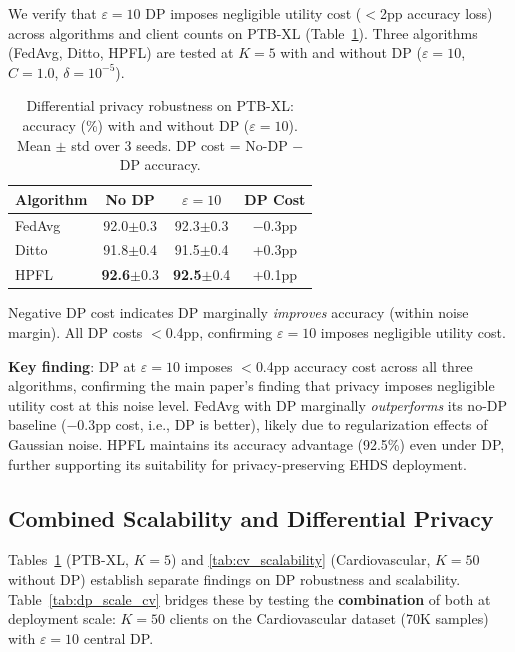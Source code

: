 \documentclass[conference,a4paper]{IEEEtran}
\begin{document}
We verify that $\varepsilon{=}10$ DP imposes negligible utility cost ($<$2pp accuracy loss) across algorithms and client counts on PTB-XL (Table~\ref{tab:dp_scale}). Three algorithms (FedAvg, Ditto, HPFL) are tested at $K{=}5$ with and without DP ($\varepsilon{=}10$, $C{=}1.0$, $\delta{=}10^{-5}$).

\begin{table}[htbp]
\centering
\caption{Differential privacy robustness on PTB-XL: accuracy (\%) with and without DP ($\varepsilon{=}10$). Mean $\pm$ std over 3 seeds. DP cost = No-DP $-$ DP accuracy.}
\label{tab:dp_scale}
\small
\begin{tabular}{lccc}
\toprule
\textbf{Algorithm} & \textbf{No DP} & \textbf{$\varepsilon{=}10$} & \textbf{DP Cost} \\
\midrule
FedAvg & 92.0{\tiny$\pm$0.3} & 92.3{\tiny$\pm$0.3} & $-$0.3pp \\
Ditto & 91.8{\tiny$\pm$0.4} & 91.5{\tiny$\pm$0.4} & +0.3pp \\
HPFL & \textbf{92.6}{\tiny$\pm$0.3} & \textbf{92.5}{\tiny$\pm$0.4} & +0.1pp \\
\bottomrule
\end{tabular}

\vspace{1mm}
\footnotesize{Negative DP cost indicates DP marginally \textit{improves} accuracy (within noise margin). All DP costs $<$0.4pp, confirming $\varepsilon{=}10$ imposes negligible utility cost.}
\end{table}

\textbf{Key finding}: DP at $\varepsilon{=}10$ imposes $<$0.4pp accuracy cost across all three algorithms, confirming the main paper's finding that privacy imposes negligible utility cost at this noise level. FedAvg with DP marginally \textit{outperforms} its no-DP baseline ($-$0.3pp cost, i.e., DP is better), likely due to regularization effects of Gaussian noise. HPFL maintains its accuracy advantage (92.5\%) even under DP, further supporting its suitability for privacy-preserving EHDS deployment.

\subsection{Combined Scalability and Differential Privacy}
\label{sec:scalability_dp_cv}

Tables~\ref{tab:dp_scale} (PTB-XL, $K{=}5$) and \ref{tab:cv_scalability} (Cardiovascular, $K{=}50$ without DP) establish separate findings on DP robustness and scalability. Table~\ref{tab:dp_scale_cv} bridges these by testing the \textbf{combination} of both at deployment scale: $K{=}50$ clients on the Cardiovascular dataset (70K samples) with $\varepsilon{=}10$ central DP.
\end{document}
